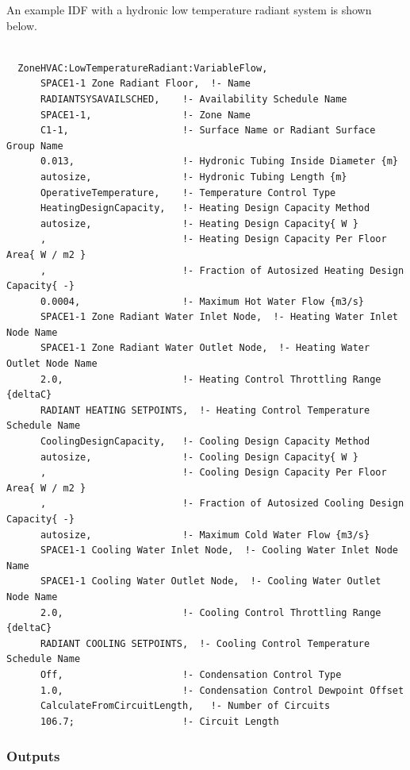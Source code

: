 An example IDF with a hydronic low temperature radiant system is shown below.

\begin{lstlisting}

  ZoneHVAC:LowTemperatureRadiant:VariableFlow,
      SPACE1-1 Zone Radiant Floor,  !- Name
      RADIANTSYSAVAILSCHED,    !- Availability Schedule Name
      SPACE1-1,                !- Zone Name
      C1-1,                    !- Surface Name or Radiant Surface Group Name
      0.013,                   !- Hydronic Tubing Inside Diameter {m}
      autosize,                !- Hydronic Tubing Length {m}
      OperativeTemperature,    !- Temperature Control Type
      HeatingDesignCapacity,   !- Heating Design Capacity Method
      autosize,                !- Heating Design Capacity{ W }
      ,                        !- Heating Design Capacity Per Floor Area{ W / m2 }
      ,                        !- Fraction of Autosized Heating Design Capacity{ -}
      0.0004,                  !- Maximum Hot Water Flow {m3/s}
      SPACE1-1 Zone Radiant Water Inlet Node,  !- Heating Water Inlet Node Name
      SPACE1-1 Zone Radiant Water Outlet Node,  !- Heating Water Outlet Node Name
      2.0,                     !- Heating Control Throttling Range {deltaC}
      RADIANT HEATING SETPOINTS,  !- Heating Control Temperature Schedule Name
      CoolingDesignCapacity,   !- Cooling Design Capacity Method
      autosize,                !- Cooling Design Capacity{ W }
      ,                        !- Cooling Design Capacity Per Floor Area{ W / m2 }
      ,                        !- Fraction of Autosized Cooling Design Capacity{ -}
      autosize,                !- Maximum Cold Water Flow {m3/s}
      SPACE1-1 Cooling Water Inlet Node,  !- Cooling Water Inlet Node Name
      SPACE1-1 Cooling Water Outlet Node,  !- Cooling Water Outlet Node Name
      2.0,                     !- Cooling Control Throttling Range {deltaC}
      RADIANT COOLING SETPOINTS,  !- Cooling Control Temperature Schedule Name
      Off,                     !- Condensation Control Type
      1.0,                     !- Condensation Control Dewpoint Offset
      CalculateFromCircuitLength,   !- Number of Circuits
      106.7;                   !- Circuit Length
\end{lstlisting}

\subsubsection{Outputs}\label{outputs-5-007}

